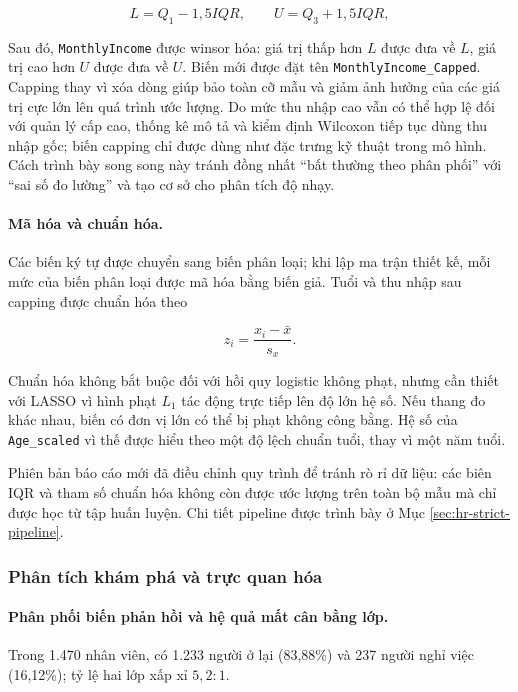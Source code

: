 \[
L=Q_1-1{,}5IQR,\qquad U=Q_3+1{,}5IQR,
\]

Sau đó, \texttt{MonthlyIncome} được winsor hóa: giá trị thấp hơn \(L\) được
đưa về \(L\), giá trị cao hơn \(U\) được đưa về \(U\). Biến mới được đặt
tên \texttt{MonthlyIncome\_Capped}. Capping thay vì xóa dòng giúp bảo
toàn cỡ mẫu và giảm ảnh hưởng của các giá trị cực lớn lên quá trình ước
lượng. Do mức thu nhập cao vẫn có thể hợp lệ đối với quản lý cấp cao,
thống kê mô tả và kiểm định Wilcoxon tiếp tục dùng thu nhập gốc; biến
capping chỉ được dùng như đặc trưng kỹ thuật trong mô hình. Cách trình
bày song song này tránh đồng nhất ``bất thường theo phân phối'' với
``sai số đo lường'' và tạo cơ sở cho phân tích độ nhạy.

\paragraph{Mã hóa và chuẩn hóa.}

Các biến ký tự được chuyển sang biến phân loại; khi lập ma trận thiết
kế, mỗi mức của biến phân loại được mã hóa bằng biến giả. Tuổi và thu
nhập sau capping được chuẩn hóa theo

\[
z_i=\frac{x_i-\bar{x}}{s_x}.
\]

Chuẩn hóa không bắt buộc đối với hồi quy logistic không phạt, nhưng cần
thiết với LASSO vì hình phạt \(L_1\) tác động trực tiếp lên độ lớn hệ số.
Nếu thang đo khác nhau, biến có đơn vị lớn có thể bị phạt không công
bằng. Hệ số của \texttt{Age\_scaled} vì thế được hiểu theo một độ lệch
chuẩn tuổi, thay vì một năm tuổi.

Phiên bản báo cáo mới đã điều chỉnh quy trình để tránh rò rỉ dữ liệu:
các biên IQR và tham số chuẩn hóa không còn được ước lượng trên toàn bộ
mẫu mà chỉ được học từ tập huấn luyện. Chi tiết pipeline được trình bày
ở Mục \ref{sec:hr-strict-pipeline}.

\subsubsection{Phân tích khám phá và trực quan hóa}

\paragraph{Phân phối biến phản hồi và hệ quả mất cân bằng lớp.}

Trong 1.470 nhân viên, có 1.233 người ở lại (83,88\%) và 237 người
nghỉ việc (16,12\%); tỷ lệ hai lớp xấp xỉ \(5{,}2:1\).

